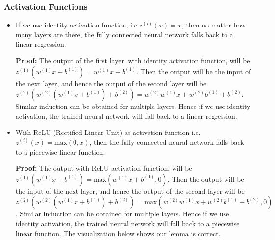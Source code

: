 \subsubsection{Activation Functions}
\begin{itemize}
\item
  If we use identity activation function, i.e.$z^{(i)}(x)=x$, then no
  matter how many layers are there, the fully connected neural network
  falls back to a linear regression.

  \textbf{Proof:} The output of the first layer, with identity
  activation function, will be
  \(z^{(1)}(w^{(1)}x+b^{(1)})=w^{(1)}x+b^{(1)}\). Then the output will
  be the input of the next layer, and hence the output of the second
  layer will be
  \(z^{(2)}(w^{(2)}(w^{(1)}x+b^{(1)})+b^{(2)})=w^{(2)}w^{(1)}x+w^{(2)}b^{(1)}+b^{(2)}\).
  Similar induction can be obtained for multiple layers. Hence if we use
  identity activation, the trained neural network will fall back to a
  linear regression. 
\item
  With ReLU (Rectified Linear Unit) as activation function
  i.e.~\(z^{(i)}(x)=\text{max}(0,x)\), then the fully connected neural
  network falls back to a piecewise linear function.

  \textbf{Proof:} The output with ReLU activation function, will be
  \(z^{(1)}(w^{(1)}x+b^{(1)})=\text{max}(w^{(1)}x+b^{(1)}, 0)\). Then
  the output will be the input of the next layer, and hence the output
  of the second layer will be
  \(z^{(2)}(w^{(2)}(w^{(1)}x+b^{(1)})+b^{(2)})=\text{max}(w^{(2)}w^{(1)}x+w^{(2)}b^{(1)}+b^{(2)},0)\).
  Similar induction can be obtained for multiple layers. Hence if we use
  identity activation, the trained neural network will fall back to a
  piecewise linear function. The visualization below shows our lemma is
  correct.
\end{itemize}